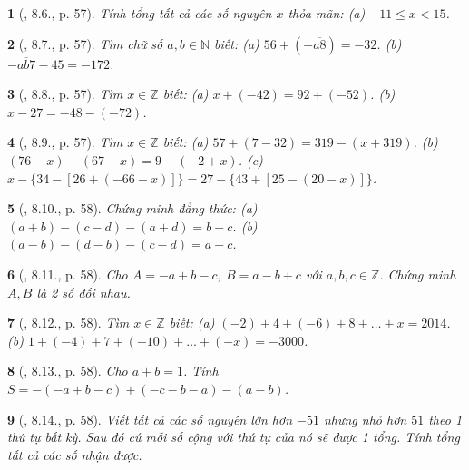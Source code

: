 \documentclass{article}
\newtheorem{baitoan}{}
\begin{document}
\begin{baitoan}[\cite{Binh_boi_duong_Toan_6_tap_1}, 8.6., p. 57]
	Tính tổng tất cả các số nguyên $x$ thỏa mãn: (a) $-11\le x < 15$.
\end{baitoan}

\begin{baitoan}[\cite{Binh_boi_duong_Toan_6_tap_1}, 8.7., p. 57]
	Tìm chữ số $a,b\in\mathbb{N}$ biết: (a) $56 + (-\overline{a8}) = -32$. (b) $-\overline{ab7} - 45 = -172$.
\end{baitoan}

\begin{baitoan}[\cite{Binh_boi_duong_Toan_6_tap_1}, 8.8., p. 57]
	Tìm $x\in\mathbb{Z}$ biết: (a) $x + (-42) = 92 + (-52)$. (b) $x - 27 = -48 - (-72)$.
\end{baitoan}

\begin{baitoan}[\cite{Binh_boi_duong_Toan_6_tap_1}, 8.9., p. 57]
	Tìm $x\in\mathbb{Z}$ biết: (a) $57 + (7 - 32) = 319 - (x + 319)$. (b) $(76 - x) - (67 - x) = 9 - (-2 + x)$. (c) $x - \{34 - [26 + (-66 - x)]\} = 27 - \{43 + [25 - (20 - x)]\}$.
\end{baitoan}

\begin{baitoan}[\cite{Binh_boi_duong_Toan_6_tap_1}, 8.10., p. 58]
	Chứng minh đẳng thức: (a) $(a + b) - (c - d) - (a + d) = b - c$. (b) $(a - b) - (d - b) - (c - d) = a - c$.
\end{baitoan}

\begin{baitoan}[\cite{Binh_boi_duong_Toan_6_tap_1}, 8.11., p. 58]
	Cho $A = -a + b - c$, $B = a - b + c$ với $a,b,c\in\mathbb{Z}$. Chứng minh $A,B$ là 2 số đối nhau.
\end{baitoan}

\begin{baitoan}[\cite{Binh_boi_duong_Toan_6_tap_1}, 8.12., p. 58]
	Tìm $x\in\mathbb{Z}$ biết: (a) $(-2) + 4 + (-6) + 8 + \ldots + x = 2014$. (b) $1 + (-4) + 7 + (-10) + \ldots + (-x) = -3000$.
\end{baitoan}

\begin{baitoan}[\cite{Binh_boi_duong_Toan_6_tap_1}, 8.13., p. 58]
	Cho $a + b = 1$. Tính $S = -(-a + b - c) + (-c - b - a) - (a - b)$.
\end{baitoan}

\begin{baitoan}[\cite{Binh_boi_duong_Toan_6_tap_1}, 8.14., p. 58]
	Viết tất cả các số nguyên lớn hơn $-51$ nhưng nhỏ hơn $51$ theo 1 thứ tự bất kỳ. Sau đó cứ mỗi số cộng với thứ tự của nó sẽ được 1 tổng. Tính tổng tất cả các số nhận được.
\end{baitoan}
\end{document}
